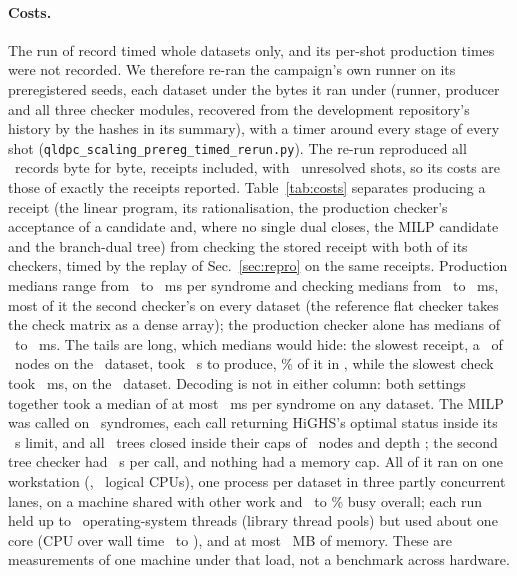 \documentclass[aps,pra,twocolumn,superscriptaddress,nofootinbib,longbibliography,floatfix]{revtex4-2}
\begin{document}
\paragraph*{Costs.} The run of record timed whole datasets only, and its per-shot production times were not recorded. We therefore re-ran the campaign's own runner on its preregistered seeds, each dataset under the bytes it ran under (runner, producer and all three checker modules, recovered from the development repository's history by the hashes in its summary), with a timer around every stage of every shot (\texttt{qldpc\_scaling\_prereg\_timed\_rerun.py}). The re-run reproduced all \PcRecords\ records byte for byte, receipts included, with \PcRerunUnresolved\ unresolved shots, so its costs are those of exactly the receipts reported. Table~\ref{tab:costs} separates producing a receipt (the linear program, its rationalisation, the production checker's acceptance of a candidate and, where no single dual closes, the MILP candidate and the branch-dual tree) from checking the stored receipt with both of its checkers, timed by the replay of Sec.~\ref{sec:repro} on the same receipts. Production medians range from \PcProdMedLo\ to \PcProdMedHi~ms per syndrome and checking medians from \PcCheckMedLo\ to \PcCheckMedHi~ms, most of it the second checker's on every dataset (the reference flat checker takes the check matrix as a dense array); the production checker alone has medians of \PcProdCheckerMedLo\ to \PcProdCheckerMedHi~ms. The tails are long, which medians would hide: the slowest receipt, a \PcProdMaxKind\ of \PcProdMaxNodes\ nodes on the \PcProdMaxWhere\ dataset, took \PcProdMaxS~s to produce, \PcProdMaxShare\% of it in \PcProdMaxStage, while the slowest check took \PcCheckMaxMs~ms, on the \PcCheckMaxWhere\ dataset. Decoding is not in either column: both settings together took a median of at most \PcDecodeMedMaxMs~ms per syndrome on any dataset. The MILP was called on \PcMilpCalls\ syndromes, each call returning HiGHS's optimal status inside its \PcMilpLimit~s limit, and all \PcBnbCalls\ trees closed inside their caps of \PcBnbNodes\ nodes and depth \PcBnbDepth; the second tree checker had \PcTreeBTimeout~s per call, and nothing had a memory cap. All of it ran on one workstation (\PcCpuName, \PcLogicalCpus\ logical CPUs), one process per dataset in three partly concurrent lanes, on a machine shared with other work and \PcBoxLo\ to \PcBoxHi\% busy overall; each run held up to \PcThreadsMax\ operating-system threads (library thread pools) but used about one core (CPU over wall time \PcCpuWallLo\ to \PcCpuWallHi), and at most \PcPeakMB~MB of memory. These are measurements of one machine under that load, not a benchmark across hardware.
\end{document}
